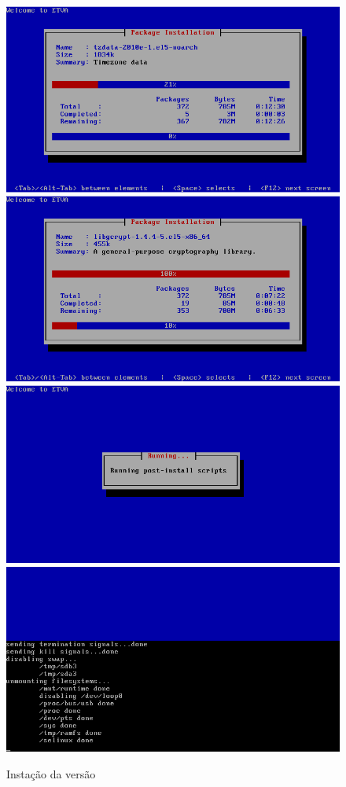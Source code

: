 \begin{figure}[H]
\begin{center}
    \includegraphics[scale=0.4]{screenshots/install_etva6.png}        
    \includegraphics[scale=0.4]{screenshots/install_etva8.png}
    \includegraphics[scale=0.4]{screenshots/install_etva9.png}
    \includegraphics[scale=0.4]{screenshots/install_etva10.png}
\caption{Instação da versão \acronym}
	\label{fig:installation_standard}
	\end{center}
\end{figure}

